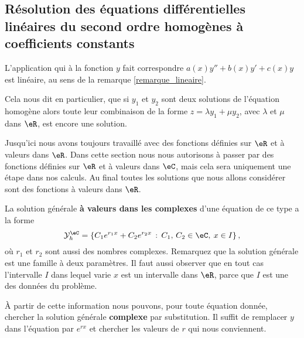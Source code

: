 \subsection{Résolution des équations différentielles linéaires du second ordre homogènes à coefficients constants}
\begin{remark}
 L'application qui à la fonction $y$ fait correspondre $a(x)y'' + b(x) y' + c(x)y$ est linéaire, au sens de la remarque \ref{remarque_lineaire}. 

Cela nous dit en particulier, que si $y_1$ et $y_2$ sont deux solutions de l'équation homogène alors toute leur combinaison de la forme $z = \lambda y_1 + \mu y_2$, avec $\lambda$ et $\mu$ dans $\eR$, est encore une solution.
 \end{remark}

\begin{framed}
  Jusqu'ici nous avons toujours travaillé avec des fonctions définies sur $\eR$ et à valeurs dans $\eR$. Dans cette section nous nous autorisons à passer par des fonctions définies sur $\eR$ et à valeurs dans $\eC$, mais cela sera uniquement une étape dans nos calculs. Au final toutes les solutions que nous allons considérer sont des fonctions à valeurs dans $\eR$.  
\end{framed}

La solution générale \textbf{à valeurs dans les complexes} d'une équation de ce type a la forme 
\begin{equation}\label{sol_gen_ordre_deux_hom}
  \mathcal{Y}_h^\eC  = \left\{C_1 e^{r_1x} +C_2 e^{r_2x} \,:\, C_1,\, C_2 \in \eC, \: x\in I \right\},
\end{equation}
où $r_1$ et $r_2$ sont aussi des nombres complexes. Remarquez que la solution générale est une famille à deux paramètres. Il faut aussi observer que en tout cas l'intervalle $I$ dans lequel varie $x$ est un intervalle dans $\eR$, parce que $I$ est une des données du problème.  

À partir de cette information nous pouvons, pour toute équation donnée, chercher la solution générale \textbf{complexe} par substitution. Il suffit de remplacer $y$ dans l'équation par $e^{rx}$ et chercher les valeurs de $r$ qui nous conviennent. 

